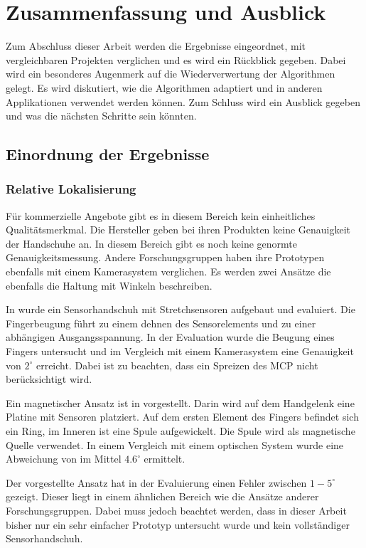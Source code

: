 \chapter{Zusammenfassung und Ausblick}
\label{chap:ende_zusammenfassung_ausblick}
Zum Abschluss dieser Arbeit werden die Ergebnisse eingeordnet, mit vergleichbaren Projekten verglichen und es wird ein Rückblick gegeben. Dabei wird ein besonderes Augenmerk auf die Wiederverwertung der Algorithmen gelegt. Es wird diskutiert, wie die Algorithmen adaptiert und in anderen Applikationen verwendet werden können. Zum Schluss wird ein Ausblick gegeben und was die nächsten Schritte sein könnten.

\section{Einordnung der Ergebnisse}

\subsection{Relative Lokalisierung}
Für kommerzielle Angebote gibt es in diesem Bereich kein einheitliches Qualitätsmerkmal. Die Hersteller geben bei ihren Produkten keine Genauigkeit der Handschuhe an. In diesem Bereich gibt es noch keine genormte Genauigkeitsmessung. Andere Forschungsgruppen haben ihre Prototypen ebenfalls mit einem Kamerasystem verglichen. Es werden zwei Ansätze die ebenfalls die Haltung mit Winkeln beschreiben.

In \cite{lin_design_2024} wurde ein Sensorhandschuh mit Stretchsensoren aufgebaut und evaluiert. Die Fingerbeugung führt zu einem dehnen des Sensorelements und zu einer abhängigen Ausgangsspannung. In der Evaluation wurde die Beugung eines Fingers untersucht und im Vergleich mit einem Kamerasystem eine Genauigkeit von $2^\circ$ erreicht. Dabei ist zu beachten, dass ein Spreizen des MCP nicht berücksichtigt wird.

Ein magnetischer Ansatz ist in \cite{parizi_auraring_2020} vorgestellt. Darin wird auf dem Handgelenk eine Platine mit Sensoren platziert. Auf dem ersten Element des Fingers befindet sich ein Ring, im Inneren ist eine Spule aufgewickelt. Die Spule wird als magnetische Quelle verwendet. In einem Vergleich mit einem optischen System wurde eine Abweichung von im Mittel $4.6^\circ$ ermittelt.

Der vorgestellte Ansatz hat in der Evaluierung einen Fehler zwischen $1-5^\circ$ gezeigt. Dieser liegt in einem ähnlichen Bereich wie die Ansätze anderer Forschungsgruppen. Dabei muss jedoch beachtet werden, dass in dieser Arbeit bisher nur ein sehr einfacher Prototyp untersucht wurde und kein vollständiger Sensorhandschuh.


